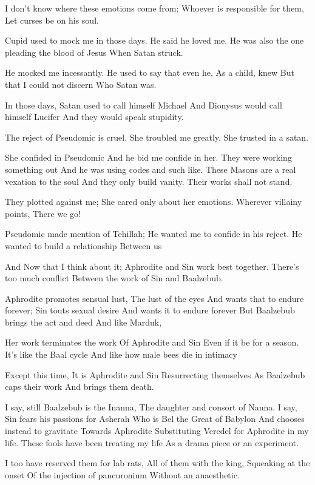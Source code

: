 \documentclass[
]{book}
\begin{document}
I don't know where these emotions come from;
Whoever is responsible for them,
Let curses be on his soul.

Cupid used to mock me in those days.
He said he loved me.
He was also the one pleading the blood of Jesus
When Satan struck.

He mocked me incessantly.
He used to say that even he,
As a child, knew
But that I could not discern
Who Satan was.

In those days,
Satan used to call himself Michael
And Dionysus would call himself Lucifer
And they would speak stupidity.

The reject of Pseudomic is cruel.
She troubled me greatly.
She trusted in a satan.

She confided in Pseudomic
And he bid me confide in her.
They were working something out
And he was using codes and such like.
These Masons are a real vexation to the soul
And they only build vanity.
Their works shall not stand.

They plotted against me;
She cared only about her emotions.
Wherever villainy points,
There we go!

Pseudomic made mention of Tehillah;
He wanted me to confide in his reject.
He wanted to build a relationship
Between us

And
Now that I think about it;
Aphrodite and Sin work best together.
There's too much conflict
Between the work of Sin and Baalzebub.

Aphrodite promotes sensual lust,
The lust of the eyes
And wants that to endure forever;
Sin touts sexual desire
And wants it to endure forever
But Baalzebub brings the act and deed
And like Marduk,

Her work terminates the work
Of Aphrodite and Sin
Even if it be for a season.
It's like the Baal cycle
And like how male bees die in intimacy

Except this time,
It is Aphrodite and Sin
Resurrecting themselves
As Baalzebub caps their work
And brings them death.

I say, still Baalzebub is the Inanna,
The daughter and consort of Nanna.
I say, Sin fears his passions for Asherah
Who is Bel the Great of Babylon
And chooses instead to gravitate
Towards Aphrodite
Substituting Veredel for Aphrodite in my life.
These fools have been treating my life
As a drama piece or an experiment.

I too have reserved them for lab rats,
All of them with the king,
Squeaking at the onset
Of the injection of pancuronium
Without an anaesthetic.
\end{document}
